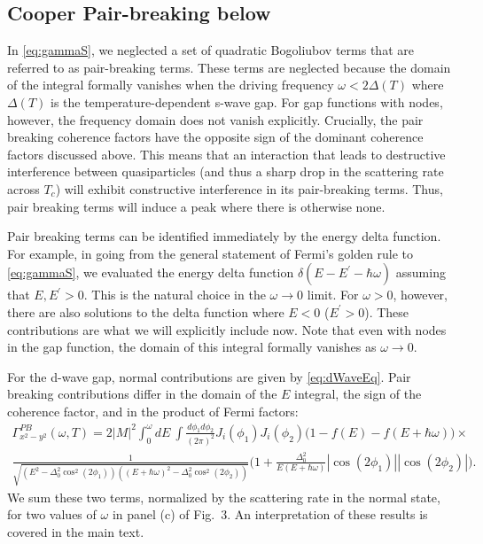 	\subsection*{Cooper Pair-breaking below \Tc}
	
	In \autoref{eq:gammaS}, we neglected a set of quadratic Bogoliubov terms that are referred to as pair-breaking terms. These terms are neglected because the domain of the integral formally vanishes when the driving frequency $\omega<2\Delta(T)$ where $\Delta(T)$ is the temperature-dependent s-wave gap. For gap functions with nodes, however, the frequency domain does not vanish explicitly. Crucially, the pair breaking coherence factors have the opposite sign of the dominant coherence factors discussed above. This means that an interaction that leads to destructive interference between quasiparticles (and thus a sharp drop in the scattering rate across $T_c$) will exhibit constructive interference in its pair-breaking terms. Thus, pair breaking terms will induce a peak where there is otherwise none.
	
	Pair breaking terms can be identified immediately by the energy delta function. For example, in going from the general statement of Fermi's golden rule to \autoref{eq:gammaS}, we evaluated the energy delta function $\delta(E-E^\prime-\hbar\omega)$ assuming that $E,E^\prime>0$. This is the natural choice in the $\omega\to 0$ limit. For $\omega>0$, however, there are also solutions to the delta function where $E<0$ ($E^\prime>0$). These contributions are what we will explicitly include now. Note that even with nodes in the gap function, the domain of this integral formally vanishes as $\omega\to 0$. 
	
	For the d-wave gap, normal contributions are given by \autoref{eq:dWaveEq}. Pair breaking contributions differ in the domain of the $E$ integral, the sign of the coherence factor, and in the product of Fermi factors:
	\begin{multline}
	\Gamma^{PB}_{x^2-y^2}(\omega,T)=2|M|^2\int_0^\omega dE~\int\frac{d\phi_1d\phi_2}{(2\pi)^2}J_i(\phi_1)J_i(\phi_2)\big(1-f(E)-f(E+\hbar\omega)\big)\times\\\frac{1}{\sqrt{(E^2-\Delta_0^2\cos^2(2\phi_1))((E+\hbar\omega)^2-\Delta_0^2\cos^2(2\phi_2))}}\bigg(1+\frac{\Delta_0^2}{E(E+\hbar\omega)}|\cos(2\phi_1)||\cos(2\phi_2)|\bigg).
	\end{multline}
	We sum these two terms, normalized by the scattering rate in the normal state, for two values of $\omega$ in panel (c) of Fig.~3. An interpretation of these results is covered in the main text.
	

